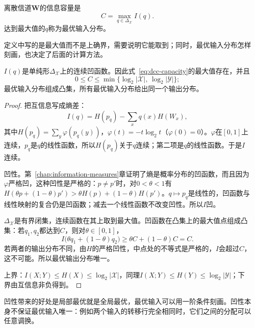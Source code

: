 \begin{definition}[信息容量]
\label{def:dcc-information-capacity}
离散信道$\bm{W}$的信息容量是
\begin{equation}
 C=\max_{q\in\Delta_{\mathcal{X}}}I(q) .
 \label{eq:dcc-capacity}
\end{equation}
达到最大值的$q$称为最优输入分布。
\end{definition}

定义中写的是最大值而不是上确界，需要说明它能取到；同时，最优输入分布怎样刻画，也决定了后面的计算方法。

\begin{theorem}[容量的存在与凹性]
\label{thm:dcc-capacity-exists}
$I(q)$是单纯形$\Delta_{\mathcal{X}}$上的连续凹函数。因此式~\eqref{eq:dcc-capacity}的最大值存在，并且
\begin{equation}
 0\leq C\leq\min\bigl\{\log_2\lvert\mathcal{X}\rvert,\ \log_2\lvert\mathcal{Y}\rvert\bigr\} ;
 \label{eq:dcc-capacity-range}
\end{equation}
最优输入分布组成凸集，所有最优输入分布给出同一个输出分布。
\end{theorem}

\begin{proof}
把互信息写成熵差：
\[
 I(q)=H(p_q)-\sum_{x}q(x)H(W_x) ,
\]
其中$H(p_q)=\sum_y\varphi(p_q(y))$，$\varphi(t)=-t\log_2t$（$\varphi(0)=0$）。$\varphi$在$[0,1]$上连续，$p_q$是$q$的线性函数，所以$H(p_q)$关于$q$连续；第二项是$q$的线性函数。于是$I$连续。

凹性。第~\ref{chap:information-measures}章证明了熵是概率分布的凹函数，而且因为$\varphi$严格凹，这种凹性是严格的：$p\neq p'$时，对$0<\theta<1$有$H(\theta p+(1-\theta)p')>\theta H(p)+(1-\theta)H(p')$。$q\mapsto p_q$是线性的，凹函数与线性映射的复合仍是凹函数；减去一个线性函数不改变凹性。所以$I$凹。

$\Delta_{\mathcal{X}}$是有界闭集，连续函数在其上取到最大值。凹函数在凸集上的最大值点组成凸集：若$q_1,q_2$都达到$C$，则对$\theta\in[0,1]$，
\[
 I\bigl(\theta q_1+(1-\theta)q_2\bigr)\geq\theta C+(1-\theta)C=C .
\]
若两者的输出分布不同，由$H$的严格凹性，中点处的不等式是严格的，$I$会超过$C$，这不可能。所以最优输出分布唯一。

上界：$I(X;Y)\leq H(X)\leq\log_2\lvert\mathcal{X}\rvert$，同理$I(X;Y)\leq H(Y)\leq\log_2\lvert\mathcal{Y}\rvert$；下界由互信息非负得到。
\end{proof}

凹性带来的好处是局部最优就是全局最优，最优输入可以用一阶条件刻画。凹性本身不保证最优输入唯一：例如两个输入的转移行完全相同时，它们之间的分配可以任意调换。

